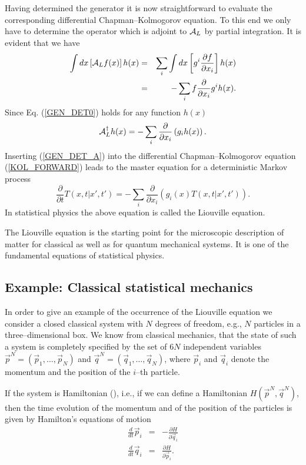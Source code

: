 Having determined the generator it is now straightforward to 
evaluate the corresponding differential Chapman--Kolmogorov 
equation. To this end we only 
have to determine the operator which is adjoint to
${\cal{A}}_L$ by partial integration. It is evident that we have
\begin{eqnarray}
\label{GEN_DET0}
\int dx \left[{\cal{A}}_L f(x) \right]h(x) &=&
          \sum_i \int dx \left[g^i 
           \frac{\partial f}{\partial x_i} \right] h(x) \nonumber \\
     & = & -\sum_i f \frac{\partial}{\partial x_i} g^i h(x).      
\end{eqnarray}
Since Eq. (\ref{GEN_DET0}) holds for any function $h(x)$
\begin{equation}
\label{GEN_DET_A}
{\cal{A}}_L^{\dagger} h(x) = -\sum_i \frac{\partial}{\partial x_i}
    \left(g_i h(x) \right).
\end{equation}
Inserting (\ref{GEN_DET_A}) into the differential Chapman--Kolmogorov 
equation
(\ref{KOL_FORWARD}) 
leads to the master equation for a deterministic Markov process
\begin{equation}
\frac{\partial}{\partial t} T(x,t|x',t') =
 - \sum_i \frac{\partial}{\partial x_i}
     \left(g_i(x)T(x,t|x',t')  \right).
\end{equation}
In statistical physics the above equation is called the Liouville 
equation.
 
The Liouville equation is the starting point for the microscopic 
description of matter for classical as well as for quantum 
mechanical systems. It is one of the fundamental equations of 
statistical physics. 

\subsection{Example: Classical statistical mechanics}
In order to give an example of the occurrence
of the Liouville equation we consider a closed classical system
with $N$ degrees of freedom, e.g., $N$ particles in a 
three--dimensional box. We know from classical mechanics, that the 
state  of such a system is completely specified by the set of $6N$
independent variables $\vec{p}^N=(\vec{p}_1, \ldots, \vec{p}_N)$ 
and $\vec{q}^N=(\vec{q}_1, \ldots, \vec{q}_N)$, where $\vec{p}_i$
and $\vec{q}_i$ denote the momentum and the position of the 
$i$--th particle. 

If the system is Hamiltonian (\cite{ARNOLD}), 
i.e., if we can define a Hamiltonian
$H(\vec{p}^N,\vec{q}^N)$, then the time evolution of the momentum 
and of the position of the particles is given by Hamilton's 
equations of motion
\begin{eqnarray*}
\frac{d}{dt} \vec{p}_i &=& - \frac{\partial H}{\partial \vec{q}_i} 
             \\
\frac{d}{dt} \vec{q}_i &=&  \frac{\partial H}{\partial \vec{p}_i} 
.
\end{eqnarray*}

